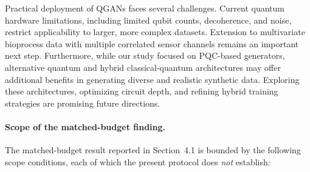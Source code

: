 \documentclass[12pt,twocolumn]{article}
\begin{document}
Practical deployment of QGANs faces several challenges. Current quantum hardware limitations, including limited qubit counts, decoherence, and noise, restrict applicability to larger, more complex datasets. Extension to multivariate bioprocess data with multiple correlated sensor channels remains an important next step. Furthermore, while our study focused on PQC-based generators, alternative quantum and hybrid classical-quantum architectures may offer additional benefits in generating diverse and realistic synthetic data. Exploring these architectures, optimizing circuit depth, and refining hybrid training strategies are promising future directions.

\paragraph{Scope of the matched-budget finding.} The matched-budget
result reported in Section~4.1 is bounded by the following scope conditions,
each of which the present protocol does \emph{not} establish:
\end{document}
